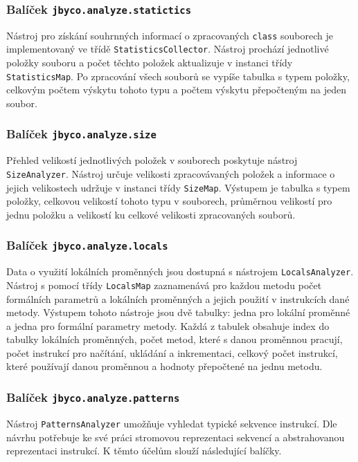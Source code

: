 \subsubsection{Balíček \texttt{jbyco.analyze.statictics}}

Nástroj pro získání souhrnných informací o zpracovaných \texttt{class} souborech je implementovaný ve třídě \texttt{StatisticsCollector}. Nástroj prochází jednotlivé položky souboru a  počet těchto položek aktualizuje v instanci třídy \texttt{StatisticsMap}. Po zpracování všech souborů se vypíše tabulka s typem položky, celkovým počtem výskytu tohoto typu a počtem výskytu přepočteným na jeden soubor. 

\subsubsection{Balíček \texttt{jbyco.analyze.size}}

Přehled velikostí jednotlivých položek v souborech poskytuje nástroj \texttt{SizeAnalyzer}. Nástroj určuje velikosti zpracovávaných položek a informace o jejich velikostech udržuje v instanci třídy \texttt{SizeMap}. Výstupem je tabulka s typem položky, celkovou velikostí tohoto typu v souborech, průměrnou velikostí pro jednu položku a velikostí ku celkové velikosti zpracovaných souborů. 

\subsubsection{Balíček \texttt{jbyco.analyze.locals}}

Data o využití lokálních proměnných jsou dostupná s nástrojem \texttt{LocalsAnalyzer}. Nástroj s pomocí třídy \texttt{LocalsMap} zaznamenává pro každou metodu počet formálních parametrů a lokálních proměnných a jejich použití v instrukcích dané metody. Výstupem tohoto nástroje jsou dvě tabulky: jedna pro lokální proměnné a jedna pro formální parametry metody. Každá z tabulek obsahuje index do tabulky lokálních proměnných, počet metod, které s danou proměnnou pracují, počet instrukcí pro načítání, ukládání a inkrementaci, celkový počet instrukcí, které používají danou proměnnou a hodnoty přepočtené na jednu metodu.

\subsubsection{Balíček \texttt{jbyco.analyze.patterns}}

Nástroj \texttt{PatternsAnalyzer} umožňuje vyhledat typické sekvence instrukcí. Dle návrhu potřebuje ke své práci stromovou reprezentaci sekvencí a abstrahovanou reprezentaci instrukcí. K těmto účelům slouží následující balíčky.

